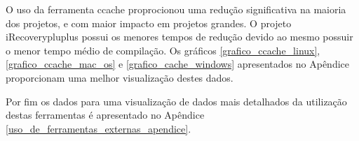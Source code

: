 O uso da ferramenta ccache proprocionou uma redução significativa na
 maioria dos projetos, e com maior impacto em projetos grandes.
 O projeto iRecoverypluplus possui os menores tempos de redução devido
 ao mesmo possuir o menor tempo médio de compilação.
 Os gráficos \ref{grafico_ccache_linux}, \ref{grafico_ccache_mac_os} e
 \ref{grafico_cache_windows} apresentados no Apêndice proporcionam uma
 melhor visualização destes dados. 

Por fim os dados para uma visualização de dados mais detalhados da utilização destas ferramentas é apresentado no Apêndice \ref{uso_de_ferramentas_externas_apendice}.
